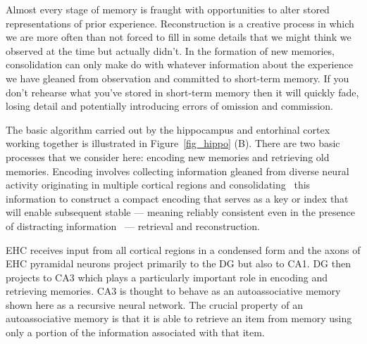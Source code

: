 \documentclass[letterpaper,11pt]{article}
\def\footnote#1{{}}
\def\colorred#1{{\color{red}#1}}
\def\urlh#1{{}}
\def\emdash{---}
\begin{document}
Almost every stage of memory is fraught with opportunities to alter stored representations of prior experience. Reconstruction is a creative process in which we are more often than not forced to fill in some details that we might think we observed at the time but actually didn't. In the formation of new memories, consolidation can only make do with whatever information about the experience we have gleaned from observation and committed to short-term memory. If you don't rehearse what you've stored in short-term memory then it will quickly fade, losing detail and potentially introducing errors of omission and commission.

The basic algorithm carried out by the hippocampus and entorhinal cortex working together is illustrated in Figure~{\urlh{#fig_Hippocampus_Anatomy_and_Physiology}{\ref{fig_hippo}}} ({\colorred{B}}). There are two basic processes that we consider here: encoding new memories and retrieving old memories. Encoding involves collecting information gleaned from diverse neural activity originating in multiple cortical regions and consolidating~\cite{MorrisetalNEURON-06} this information to construct a compact encoding that serves as a key or index that will enable subsequent stable \emdash{} meaning reliably consistent even in the presence of distracting information~\cite{EisenbergetalSCIENCE-03} \emdash{} retrieval and reconstruction\footnote{%
%
   Memory consolidation is a category of processes that stabilize a memory trace after its initial acquisition. Consolidation is distinguished into two specific processes, synaptic consolidation, which is synonymous with late-phase long-term potentiation and occurs within the first few hours after learning, and systems consolidation, where hippocampus-dependent memories become independent of the hippocampus over a period of weeks to years. Recently, a third process has become the focus of research, reconsolidation, in which previously-consolidated memories can be made labile again through reactivation of the memory trace. ({\urlh{https://en.wikipedia.org/wiki/Memory_consolidation}{SOURCE}})}.

EHC receives input from all cortical regions in a condensed form and the axons of EHC pyramidal neurons project primarily to the DG but also to CA1. DG then projects to CA3 which plays a particularly important role in encoding and retrieving memories. CA3 is thought to behave as an autoassociative memory shown here as a recursive neural network. The crucial property of an autoassociative memory is that it is able to retrieve an item from memory using only a portion of the information associated with that item\footnote{%
% 
  {\it{Autoassociative memories}} are capable of retrieving a piece of data upon presentation of only partial information. {\it{Hopfield networks}} are recurrent artificial neural networks that have been shown to act as an autoassociative memory since they are capable of remembering data by observing a portion of that data. Hopfield networks can be trained with a variety of different learning methods including Hebbian learning which is often summarized as "neurons that fire together wire together". ({\urlh{https://en.wikipedia.org/wiki/Hopfield_network}{SOURCE}})}. 
\end{document}
